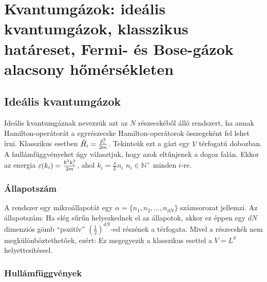 \chapter{Kvantumg\'azok: ide\'alis kvantumg\'azok, klasszikus hat\'areset, Fermi- \'es Bose-g\'azok alacsony h\H{o}m\'ers\'ekleten}
 
 \section{Ideális kvantumgázok}
  
  Ideális kvantumgáznak nevezzük azt az $N$ részecskéből álló rendszert, ha annak Hamilton-operátorát a
  egyrészecske Hamilton-operátorok összegeként fel lehet írni. Klasszikus esetben $\hat{H}_i=\frac{\hat{p}_i^2}{2m}$. Tekintsük ezt a gázt egy $V$ térfogatú dobozban. A hullámfüggvényeket úgy választjuk, hogy azok eltűnjenek a dogoz falán. Ekkor az energia $\varepsilon(k_i)=\frac{\hbar^2 k_i^2}{2m}$, ahol $k_i=\frac{\pi}{L}n_i$ $n_i\in\mathbb{N}^+$ minden $i$-re.
  
  \subsection{Állapotszám}
  
   A rendszer egy mikroállapotát egy $\alpha=\{n_1, n_2,\dots,n_{dN}\}$ számsorozat jellemzi. Az állapotszám:
   Ha elég sűrűn helyezkednek el az állapotok, akkor ez éppen egy $dN$ dimenziós gömb ``pozitív'' $\left(\frac{1}{2}\right)^{dN}$-ed részének a térfogata. Mivel a részecskék nem megkülönböztethetőek, ezért:
   Ez megegyezik a klasszikus esettel a $V=L^d$ helyettesítéssel.
   
  \subsection{Hullámfüggvények}
   
